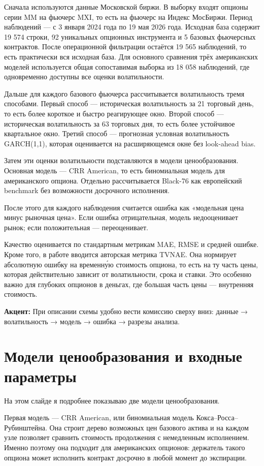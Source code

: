 \documentclass[11pt,a4paper]{article}
\newcommand{\slidetitle}[1]{\section{#1}}
\newcommand{\note}[1]{%
  \vspace{0.15em}
  \noindent\colorbox{softblue}{%
    \parbox{\dimexpr\linewidth-2\fboxsep\relax}{\textbf{Акцент:} #1}%
  }\vspace{0.25em}
}
\begin{document}
Сначала используются данные Московской биржи. В выборку входят опционы серии MM на фьючерс MXI, то есть на фьючерс на Индекс МосБиржи. Период наблюдений --- с 3 января 2024 года по 19 мая 2026 года. Исходная база содержит 19 574 строки, 92 уникальных опционных инструмента и 5 базовых фьючерсных контрактов. После операционной фильтрации остаётся 19 565 наблюдений, то есть практически вся исходная база. Для основного сравнения трёх американских моделей используется общая сопоставимая выборка из 18 058 наблюдений, где одновременно доступны все оценки волатильности.

Дальше для каждого базового фьючерса рассчитывается волатильность тремя способами. Первый способ --- историческая волатильность за 21 торговый день, то есть более короткое и быстро реагирующее окно. Второй способ --- историческая волатильность за 63 торговых дня, то есть более устойчивое квартальное окно. Третий способ --- прогнозная условная волатильность GARCH(1,1), которая оценивается на расширяющемся окне без look-ahead bias.

Затем эти оценки волатильности подставляются в модели ценообразования. Основная модель --- CRR American, то есть биномиальная модель для американского опциона. Отдельно рассчитывается Black-76 как европейский benchmark без возможности досрочного исполнения.

После этого для каждого наблюдения считается ошибка как «модельная цена минус рыночная цена». Если ошибка отрицательная, модель недооценивает рынок; если положительная --- переоценивает.

Качество оценивается по стандартным метрикам MAE, RMSE и средней ошибке. Кроме того, в работе вводится авторская метрика TVNAE. Она нормирует абсолютную ошибку на временну́ю стоимость опциона, то есть на ту часть цены, которая действительно зависит от волатильности, срока и ставки. Это особенно важно для глубоких опционов в деньгах, где большая часть цены --- внутренняя стоимость.

\note{При описании схемы удобно вести комиссию сверху вниз: данные → волатильность → модель → ошибка → разрезы анализа.}

\slidetitle{Модели ценообразования и входные параметры}

На этом слайде я подробнее показываю две модели ценообразования.

Первая модель --- CRR American, или биномиальная модель Кокса--Росса--Рубинштейна. Она строит дерево возможных цен базового актива и на каждом узле позволяет сравнить стоимость продолжения с немедленным исполнением. Именно поэтому она подходит для американских опционов: держатель такого опциона может исполнить контракт досрочно в любой момент до экспирации.
\end{document}
